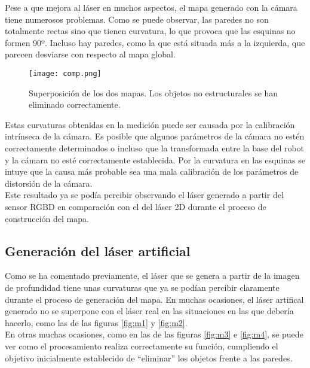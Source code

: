 Pese a que mejora al láser en muchos aspectos, el mapa generado con la cámara tiene numerosos problemas. Como se puede observar, las paredes no son totalmente rectas sino que tienen curvatura, lo que provoca que las esquinas no formen 90º. Incluso hay paredes, como la que está situada más a la izquierda, que parecen desviarse con respecto al mapa global.\\

\begin{figure}[h]
	\begin{center} 
		\texttt{[image: comp.png]}
	\end{center}
	\caption{Superposición de los dos mapas. Los objetos no estructurales se han eliminado correctamente.}
	\label{fig:comp}
\end{figure}

Estas curvaturas obtenidas en la medición puede ser causada por la calibración intrínseca de la cámara. Es posible que algunos parámetros de la cámara no estén correctamente determinados o incluso que la transformada entre la base del robot y la cámara no esté correctamente establecida. Por la curvatura en las esquinas se intuye que la causa más probable sea una mala calibración de los parámetros de distorsión de la cámara.\\

Este resultado ya se podía percibir observando el láser generado a partir del sensor RGBD en comparación con el del láser 2D durante el proceso de construcción del mapa.\\

\subsection{Generación del láser artificial}

Como se ha comentado previamente, el láser que se genera a partir de la imagen de profundidad tiene unas curvaturas que ya se podían percibir claramente durante el proceso de generación del mapa. En muchas ocasiones, el láser artifical generado no se superpone con el láser real en las situaciones en las que debería hacerlo, como las de las figuras \ref{fig:m1} y \ref{fig:m2}.\\

En otras muchas ocasiones, como en las de las figuras \ref{fig:m3} e \ref{fig:m4}, se puede ver como el procesamiento realiza correctamente su función, cumpliendo el objetivo inicialmente establecido de ``eliminar'' los objetos frente a las paredes.\\

